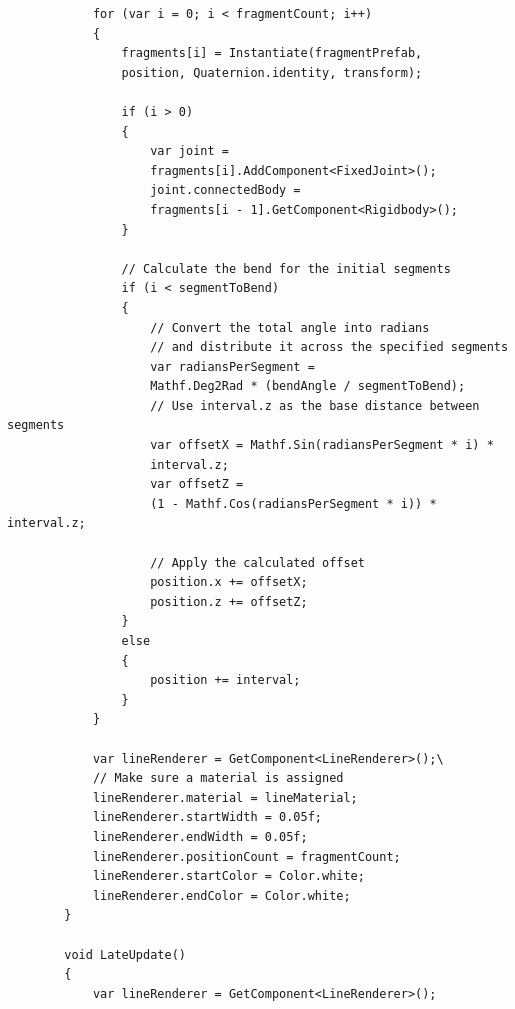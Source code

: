 \documentclass[12pt]{article}
\begin{document}
\begin{enumerate}
\begin{verbatim}
            for (var i = 0; i < fragmentCount; i++)
            {
                fragments[i] = Instantiate(fragmentPrefab, 
                position, Quaternion.identity, transform);

                if (i > 0)
                {
                    var joint = 
                    fragments[i].AddComponent<FixedJoint>();
                    joint.connectedBody = 
                    fragments[i - 1].GetComponent<Rigidbody>();
                }

                // Calculate the bend for the initial segments
                if (i < segmentToBend)
                {
                    // Convert the total angle into radians 
                    // and distribute it across the specified segments
                    var radiansPerSegment = 
                    Mathf.Deg2Rad * (bendAngle / segmentToBend);
                    // Use interval.z as the base distance between segments
                    var offsetX = Mathf.Sin(radiansPerSegment * i) * 
                    interval.z; 
                    var offsetZ = 
                    (1 - Mathf.Cos(radiansPerSegment * i)) * interval.z;

                    // Apply the calculated offset
                    position.x += offsetX;
                    position.z += offsetZ;
                }
                else
                {
                    position += interval;
                }
            }

            var lineRenderer = GetComponent<LineRenderer>();\
            // Make sure a material is assigned
            lineRenderer.material = lineMaterial; 
            lineRenderer.startWidth = 0.05f;
            lineRenderer.endWidth = 0.05f;
            lineRenderer.positionCount = fragmentCount;
            lineRenderer.startColor = Color.white;
            lineRenderer.endColor = Color.white;
        }

        void LateUpdate()
        {
            var lineRenderer = GetComponent<LineRenderer>();


\end{verbatim}
\end{enumerate}
\end{document}
